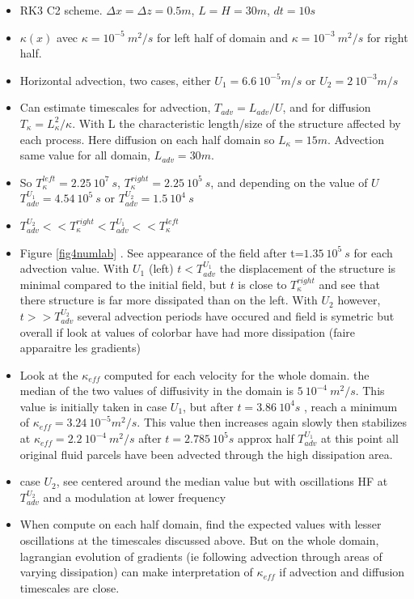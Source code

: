 \begin{itemize}
\item RK3 C2 scheme. $\Delta x = \Delta z = 0.5m$, $L = H = 30m$, $dt=10s$
\item $\kappa(x)$ avec $\kappa = 10^{-5} \ m^2/s$ for left half of domain and $\kappa = 10^{-3} \ m^2/s$ for right half. 
\item Horizontal advection, two cases, either $U_1=6.6 \ 10^{-5} m/s $ or $U_2=2 \ 10^{-3} m/s $
\item Can estimate timescales for advection, $T_{adv}=L_{adv}/U$, and for diffusion $T_{\kappa}=L_{\kappa}^2/{\kappa}$. With L the characteristic length/size of the structure affected by each process. Here diffusion on each half domain so $L_{\kappa}=15m$. Advection same value for all domain, $L_{adv}=30m$.
\item So $T_{\kappa}^{left}=2.25 \ 10^7 \ s$, $T_{\kappa}^{right}=2.25 \ 10^5 \ s$, and depending on the value of $U$ $T_{adv}^{U_1}=4.54 \ 10^5 \ s$ or $T_{adv}^{U_2}=1.5 \ 10^4 \ s$
\item $T_{adv}^{U_2}<<T_{\kappa}^{right}<T_{adv}^{U_1}<<T_{\kappa}^{left}$
\item Figure \ref{fig4numlab} . See appearance of the field after t=$1.35 \ 10^5 \ s$ for each advection value. With $U_1$ (left) $t<T_{adv}^{U_1}$ the displacement of the structure is minimal compared to the initial field, but $t$ is close to $T_{\kappa}^{right}$ and see that there structure is far more dissipated than on the left. With $U_2$ however, $t>>T_{adv}^{U_2}$ several advection periods have occured and field is symetric but overall if look at values of colorbar have had more dissipation (faire apparaitre les gradients)
\item  Look at the $\kappa_{eff}$ computed for each velocity for the whole domain. the median of the two values of diffusivity in the domain is $5 \ 10^{-4} \ m^2/s$. This value is initially taken in case $U_1$, but after $t=3.86 \ 10^4 s$ , reach a minimum of $\kappa_{eff}=3.24 \ 10^{-5} m^2/s$. This value then increases again slowly then stabilizes at $\kappa_{eff}=2.2 \ 10^{-4} \ m^2/s$ after $t=2.785 \ 10^5 s$ approx half $T_{adv}^{U_1}$ at this point all original fluid parcels have been advected through the high dissipation area.
\item case $U_2$, see centered around the median value but with oscillations HF at $T_{adv}^{U_2}$ and a modulation at lower frequency
\item When compute on each half domain, find the expected values with lesser oscillations at the timescales discussed above. But on the whole domain, lagrangian evolution of gradients (ie following advection through areas of varying dissipation) can make interpretation of $\kappa_{eff}$ if advection and diffusion timescales are close. 
\end{itemize}



